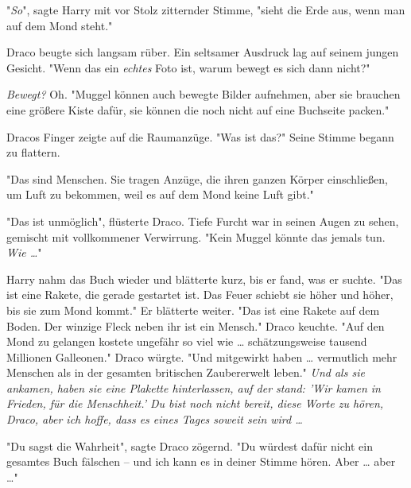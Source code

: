 {"\emph{So}", sagte Harry mit vor Stolz zitternder Stimme, "sieht die Erde aus, wenn man auf dem Mond steht."

Draco beugte sich langsam rüber. Ein seltsamer Ausdruck lag auf seinem jungen Gesicht. "Wenn das ein \emph{echtes} Foto ist, warum bewegt es sich dann nicht?"

\emph{Bewegt?} Oh. "Muggel können auch bewegte Bilder aufnehmen, aber sie brauchen eine größere Kiste dafür, sie können die noch nicht auf eine Buchseite packen."

Dracos Finger zeigte auf die Raumanzüge. "Was ist das?" Seine Stimme begann zu flattern.

"Das sind Menschen. Sie tragen Anzüge, die ihren ganzen Körper einschließen, um Luft zu bekommen, weil es auf dem Mond keine Luft gibt."

"Das ist unmöglich", flüsterte Draco. Tiefe Furcht war in seinen Augen zu sehen, gemischt mit vollkommener Verwirrung. "Kein Muggel könnte das jemals tun. \emph{Wie …}"

Harry nahm das Buch wieder und blätterte kurz, bis er fand, was er suchte. "Das ist eine Rakete, die gerade gestartet ist. Das Feuer schiebt sie höher und höher, bis sie zum Mond kommt." Er blätterte weiter. "Das ist eine Rakete auf dem Boden. Der winzige Fleck neben ihr ist ein Mensch." Draco keuchte. "Auf den Mond zu gelangen kostete ungefähr so viel wie … schätzungsweise tausend Millionen Galleonen." Draco würgte. "Und mitgewirkt haben … vermutlich mehr Menschen als in der gesamten britischen Zaubererwelt leben." \emph{Und als sie ankamen, haben sie eine Plakette hinterlassen, auf der stand: 'Wir kamen in Frieden, für die Menschheit.' Du bist noch nicht bereit, diese Worte zu hören, Draco, aber ich hoffe, dass es eines Tages soweit sein wird …}

"Du sagst die Wahrheit", sagte Draco zögernd. "Du würdest dafür nicht ein gesamtes Buch fälschen -- und ich kann es in deiner Stimme hören. Aber … aber …"

}
